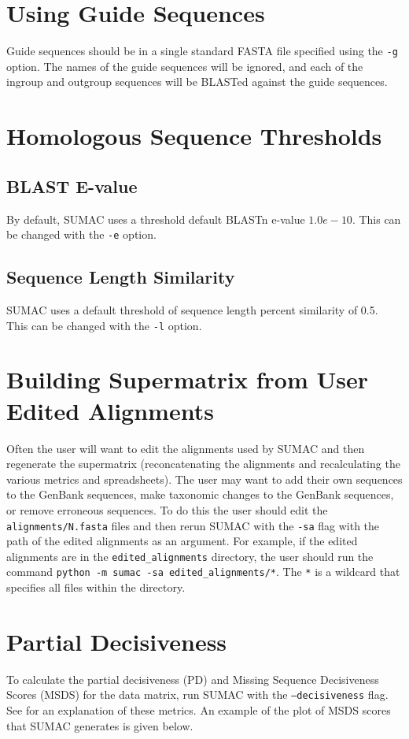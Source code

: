 \documentclass[10pt]{report}
\begin{document}
\section{Using Guide Sequences}

Guide sequences should be in a single standard FASTA file specified
using the \verb|-g| option. The names of the
guide sequences will be ignored, and each of the ingroup and outgroup 
sequences will be BLASTed against the guide sequences.

\section{Homologous Sequence Thresholds}

\subsection{BLAST E-value}
By default, SUMAC uses a threshold default BLASTn e-value $1.0e-10$.
This can be changed with the \verb|-e| option.

\subsection{Sequence Length Similarity}
SUMAC uses a default threshold of sequence length percent similarity
of 0.5. This can be changed with the \verb|-l| option.

\section{Building Supermatrix from User Edited Alignments}
Often the user will want to edit the alignments used by SUMAC
and then regenerate the supermatrix (reconcatenating the alignments and
recalculating the various metrics and spreadsheets). The user may want to add their own
sequences to the GenBank sequences, make taxonomic changes to the GenBank sequences, or remove erroneous
sequences. To do this the user should edit the \texttt{alignments/N.fasta}
files and then rerun SUMAC with the \texttt{-sa} flag with the path
of the edited alignments as an argument. For example, if the edited
alignments are in the \texttt{edited\_alignments} directory, the user
should run the command \texttt{python -m sumac -sa edited\_alignments/*}. 
The \texttt{*} is a wildcard that specifies all files within the directory.


\section{Partial Decisiveness}
To calculate the partial decisiveness (PD) and Missing Sequence Decisiveness Scores (MSDS)
for the data matrix, run SUMAC with the \texttt{--decisiveness} flag.
See \citet{sumac} for an explanation of these metrics. 
An example of the plot of MSDS scores that SUMAC generates is given below.
\end{document}
